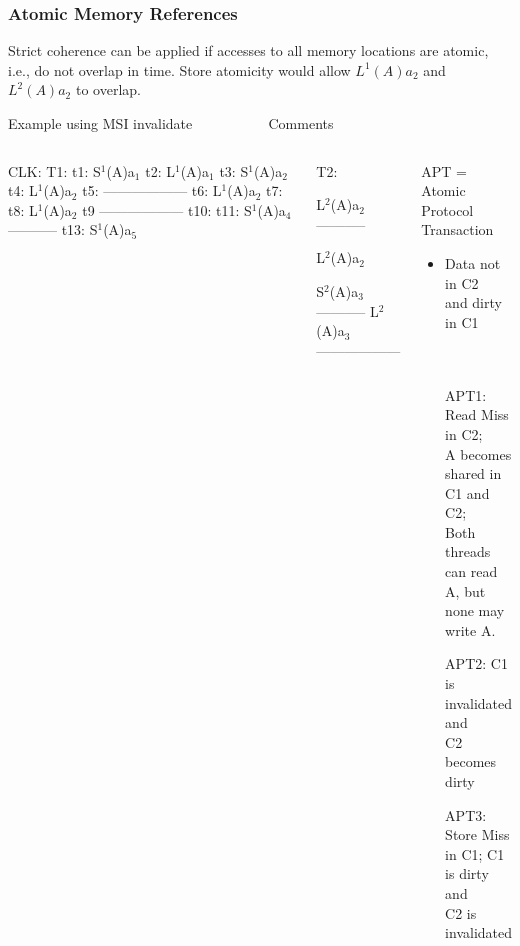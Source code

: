 \documentclass{beamer}
\newcommand{\emp}[1]{\textcolor{DikuRed}{ #1}}
\newcommand{\mymath}[1]{$ #1 $}
\newcommand{\myindx}[1]{_{#1}}
\newcommand{\myindu}[1]{^{#1}}
\begin{document}
\begin{frame}[fragile,t]
\frametitle{Atomic Memory References}

Strict coherence can be applied if accesses to all memory locations are atomic,
i.e., do not overlap in time.  Store atomicity would allow $L^1(A)a_2$ and 
$L^2(A)a_2$ to overlap.

\begin{block}{Example using MSI invalidate{\tt~~~~~~~~~~} Comments}
\begin{columns}
\begin{colorcode}[fontsize=\scriptsize]
CLK: T1:
t1:  S\mymath{\myindu{1}}(A)a\mymath{\myindx{1}}
t2:  L\mymath{\myindu{1}}(A)a\mymath{\myindx{1}}
t3:  S\mymath{\myindu{1}}(A)a\mymath{\myindx{2}}
t4:  L\mymath{\myindu{1}}(A)a\mymath{\myindx{2}}
t5:  ------------------
t6:  L\mymath{\myindu{1}}(A)a\mymath{\myindx{2}}
t7:  
t8:  L\mymath{\myindu{1}}(A)a\mymath{\myindx{2}}
t9   ------------------
t10: 
t11: S\mymath{\myindu{1}}(A)a\mymath{\myindx{4}}-----------
t13: S\mymath{\myindu{1}}(A)a\mymath{\myindx{5}}
\end{colorcode} 
\begin{colorcode}[fontsize=\scriptsize]
T2:




L\mymath{\myindu{2}}(A)a\mymath{\myindx{2}}-----------

L\mymath{\myindu{2}}(A)a\mymath{\myindx{2}}

S\mymath{\myindu{2}}(A)a\mymath{\myindx{3}}-----------
L\mymath{\myindu{2}}(A)a\mymath{\myindx{3}}
------------------

\end{colorcode} 
\pause
\begin{scriptsize}
\emp{APT} = Atomic Protocol Transaction\\
\begin{itemize}
    \item Data not in C2\\
            and dirty in C1\\
            {\tt~~}\\
            {\tt~~}\\

    \item[\emp{APT1}:] Read Miss in C2;\\
                        A becomes shared in C1 and C2;\\
                        Both threads can read A, but\\
                        none may write A.
    \item[\emp{APT2}:] C1 is invalidated and\\ 
                      C2 becomes dirty
    \item[\emp{APT3:}] Store Miss in C1; C1 is dirty and\\
                        C2 is invalidated
\end{itemize}
\end{scriptsize}
\end{columns}
\end{block}

\end{frame}
\end{document}

